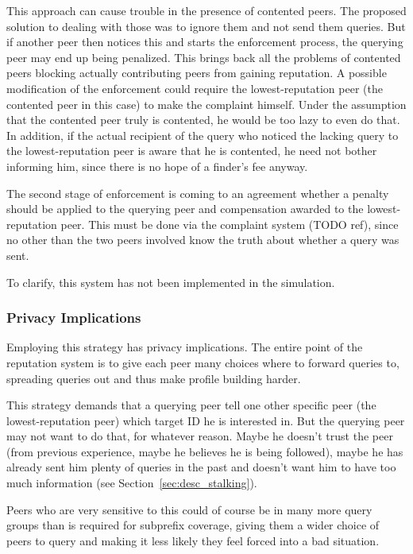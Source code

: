 This approach can cause trouble in the presence of contented peers. The proposed
solution to dealing with those was to ignore them and not send them queries. But
if another peer then notices this and starts the enforcement process, the
querying peer may end up being penalized. This brings back all the problems of
contented peers blocking actually contributing peers from gaining reputation. A
possible modification of the enforcement could require the lowest-reputation
peer (the contented peer in this case) to make the complaint himself. Under the
assumption that the contented peer truly is contented, he would be too lazy to
even do that. In addition, if the actual recipient of the query who noticed the
lacking query to the lowest-reputation peer is aware that he is contented, he
need not bother informing him, since there is no hope of a finder's fee anyway.

The second stage of enforcement is coming to an agreement whether a penalty
should be applied to the querying peer and compensation awarded to the
lowest-reputation peer. This must be done via the complaint system (TODO ref),
since no other than the two peers involved know the truth about whether a query
was sent.

To clarify, this system has not been implemented in the simulation.

\subsubsection{Privacy Implications}
\label{sec:selection_overlap_rep_sorted_privacy}
Employing this strategy has privacy implications. The entire point of the
reputation system is to give each peer many choices where to forward queries to,
spreading queries out and thus make profile building harder.

This strategy demands that a querying peer tell one other specific peer (the
lowest-reputation peer) which target ID he is interested in. But the querying
peer may not want to do that, for whatever reason. Maybe he doesn't trust the
peer (from previous experience, maybe he believes he is being followed), maybe
he has already sent him plenty of queries in the past and doesn't want him to
have too much information (see Section~\ref{sec:desc_stalking}).

Peers who are very sensitive to this could of course be in many more query
groups than is required for subprefix coverage, giving them a wider choice of
peers to query and making it less likely they feel forced into a bad situation.

